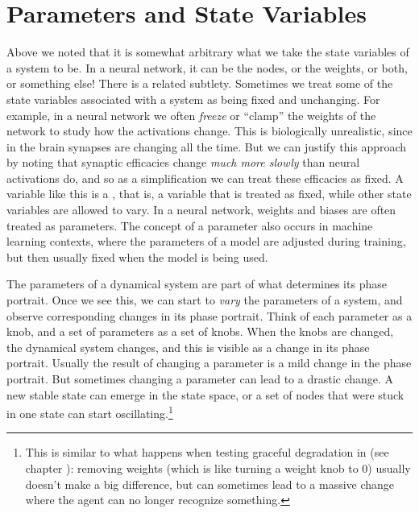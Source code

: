 \section{Parameters and State Variables}


Above we noted that it is somewhat arbitrary what we take the state variables of a system to be. In a neural network, it can be the nodes, or the weights, or both, or something else! There is a related subtlety. Sometimes we treat some of the state variables associated with a system as being fixed and unchanging. For example, in a neural network we often \emph{freeze} or ``clamp'' the weights of the network to study how the activations change. This is biologically unrealistic, since in the brain synapses are changing all the time. But we can justify this approach by noting that synaptic efficacies change \emph{much more slowly} than neural activations do, and so as a simplification we can treat these efficacies as fixed. A variable like this is a , that is, a variable that is treated as fixed, while other state variables are allowed to vary. In a neural network, weights and biases are often treated as parameters. The concept of a parameter also occurs in machine learning contexts, where the parameters of a model are adjusted during training, but then usually fixed when the model is being used.

The parameters of a dynamical system are part of what determines its phase portrait. Once we see this, we can start to \emph{vary} the parameters of a system, and observe corresponding changes in its phase portrait. Think of each parameter as a knob, and a set of parameters as a set of knobs. When the knobs are changed, the dynamical system changes, and this is visible as a change in its phase portrait. Usually the result of changing a parameter is a mild change in the phase portrait. But sometimes changing a parameter can lead to a drastic change. A new stable state can emerge in the state space, or a set of nodes that were stuck in one state can start oscillating.\footnote{This is similar to what happens when testing graceful degradation in  (see chapter ): removing weights (which is like turning a weight knob to 0) usually doesn't make a big difference, but can sometimes lead to a massive change where the agent can no longer recognize something.}

